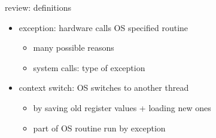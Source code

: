 \begin{frame}{review: definitions}
\begin{itemize}
\item exception: hardware calls OS specified routine
    \begin{itemize}
    \item many possible reasons
    \item system calls: type of exception
    \end{itemize}
\item context switch: OS switches to another thread
    \begin{itemize}
    \item by saving old register values + loading new ones
    \item part of OS routine run by exception
    \end{itemize}
\end{itemize}
\end{frame}

